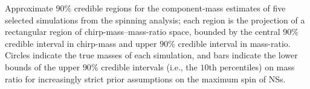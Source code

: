 \label{fig:comp_masses} Approximate $90\%$ credible regions for the component-mass estimates of five selected simulations from the spinning analysis; each region is the projection of a rectangular region of chirp-mass--mass-ratio space, bounded by the central $90\%$ credible interval in chirp-mass and upper $90\%$ credible interval in mass-ratio. Circles indicate the true masses of each simulation, and bars indicate the lower bounds of the upper $90\%$ credible intervals (i.e., the $10$th percentiles) on mass ratio for increasingly strict prior assumptions on the maximum spin of NSs.